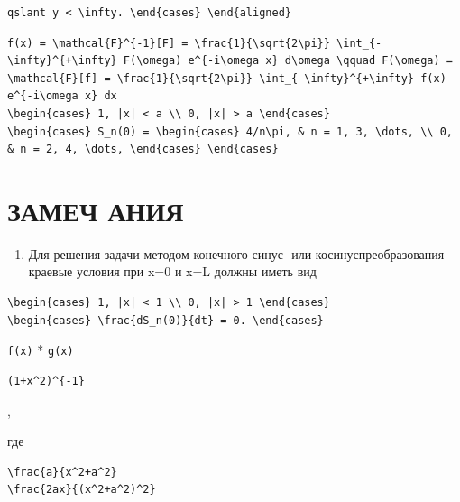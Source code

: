 \documentclass[
  ukrainian,
]{article}
\providecommand{\tightlist}{%
  \setlength{\itemsep}{0pt}\setlength{\parskip}{0pt}}
\begin{document}
\begin{verbatim}
qslant y < \infty. \end{cases} \end{aligned}
\end{verbatim}

\begin{verbatim}
f(x) = \mathcal{F}^{-1}[F] = \frac{1}{\sqrt{2\pi}} \int_{-\infty}^{+\infty} F(\omega) e^{-i\omega x} d\omega \qquad F(\omega) = \mathcal{F}[f] = \frac{1}{\sqrt{2\pi}} \int_{-\infty}^{+\infty} f(x) e^{-i\omega x} dx
\begin{cases} 1, |x| < a \\ 0, |x| > a \end{cases}
\begin{cases} S_n(0) = \begin{cases} 4/n\pi, & n = 1, 3, \dots, \\ 0, & n = 2, 4, \dots, \end{cases} \end{cases}
\end{verbatim}

\section{ЗАМЕЧ
АНИЯ}\label{ux437ux430ux43cux435ux447-ux430ux43dux438ux44f}

\begin{enumerate}
\def\labelenumi{\arabic{enumi}.}
\tightlist
\item
  Для решения задачи методом конечного синус- или косинуспреобразования
  краевые условия при x=0 и x=L должны иметь вид
\end{enumerate}

\begin{verbatim}
\begin{cases} 1, |x| < 1 \\ 0, |x| > 1 \end{cases}
\begin{cases} \frac{dS_n(0)}{dt} = 0. \end{cases}
\end{verbatim}

\texttt{f(x)} * \texttt{g(x)}

\begin{verbatim}
(1+x^2)^{-1}
\end{verbatim}

,

где

\begin{verbatim}
\frac{a}{x^2+a^2}
\frac{2ax}{(x^2+a^2)^2}
\end{verbatim}
\end{document}
